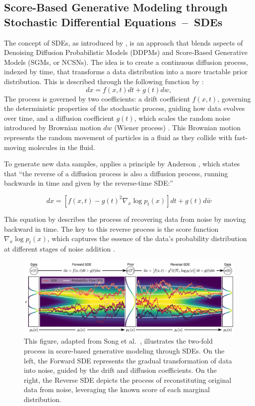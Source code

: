 \subsection{Score-Based Generative Modeling through Stochastic Differential Equations~--~SDEs}\label{SDEs}

The concept of SDEs, as introduced by \citeauthor{song2020score}, is an approach that blends aspects of Denoising Diffusion Probabilistic Models (DDPMs) and Score-Based Generative Models (SGMs, or NCSNs). The idea is to create a continuous diffusion process, indexed by time, that transforms a data distribution into a more tractable prior distribution. This is described through the following function by \citeauthor{song2020score}: \[ dx = f(x, t)dt + g(t)dw, \] The process is governed by two coefficients: a drift coefficient \( f(x, t) \), governing the deterministic properties of the stochastic process, guiding how data evolves over time, and a diffusion coefficient \( g(t) \), which scales the random noise introduced by Brownian motion \( dw \) (Wiener process) \citep{song2020score}. This Brownian motion represents the random movement of particles in a fluid as they collide with fast-moving molecules in the fluid. 

To generate new data samples, \citeauthor{song2020score} applies a principle by Anderson \citep{anderson1982313}, which states that ``the reverse of a diffusion process is also a diffusion process, running backwards in time and given by the reverse-time SDE:\@''

\[ dx = \left[ f(x, t) - g{(t)}^2 \nabla_x \log p_t(x) \right] dt + g(t)d\bar{w} \]

This equation by \citeauthor{song2020score} describes the process of recovering data from noise by moving backward in time. The key to this reverse process is the score function \(\nabla_x \log p_t(x) \), which captures the essence of the data's probability distribution at different stages of noise addition \citep{song2019SGM}.

\begin{figure}[ht]
  \centering
    \includegraphics[width=1\columnwidth]{figures/DiffusionModels_SDEs.png}
    \caption{This figure, adapted from Song et al.~\citep{song2020score}, illustrates the two-fold process in score-based generative modeling through SDEs. On the left, the Forward SDE represents the gradual transformation of data into noise, guided by the drift and diffusion coefficients. On the right, the Reverse SDE depicts the process of reconstituting original data from noise, leveraging the known score of each marginal distribution.}\label{fig:DM_SDEs}
\end{figure}

